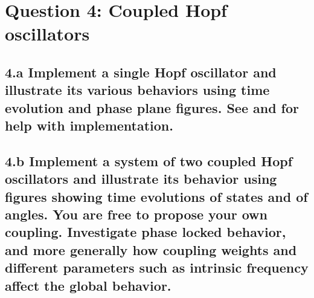 \documentclass{cmc}
\begin{document}
\section*{Question 4: Coupled Hopf oscillators}

\subsection*{4.a Implement a single Hopf oscillator and illustrate its various
  behaviors using time evolution and phase plane figures. See
   and  for help with implementation.}


\subsection*{4.b Implement a system of two coupled Hopf oscillators and
  illustrate its behavior using figures showing time evolutions of states and of
  angles. You are free to propose your own coupling.  Investigate phase locked
  behavior, and more generally how coupling weights and different parameters
  such as intrinsic frequency affect the global behavior.}
\end{document}
